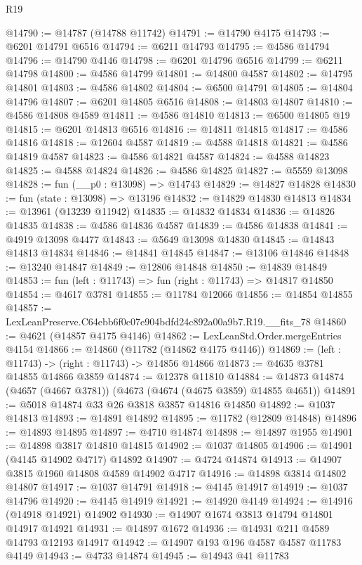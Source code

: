 \begin{lexlean}{R19}
\begin{coremodule}
@14790 := @14787 (@14788 @11742)
@14791 := @14790 @4175
@14793 := @6201 @14791 @6516
@14794 := @6211 @14793
@14795 := @4586 @14794
@14796 := @14790 @4146
@14798 := @6201 @14796 @6516
@14799 := @6211 @14798
@14800 := @4586 @14799
@14801 := @14800 @4587
@14802 := @14795 @14801
@14803 := @4586 @14802
@14804 := @6500 @14791
@14805 := @14804 @14796
@14807 := @6201 @14805 @6516
@14808 := @14803 @14807
@14810 := @4586 @14808 @4589
@14811 := @4586 @14810
@14813 := @6500 @14805 @19
@14815 := @6201 @14813 @6516
@14816 := @14811 @14815
@14817 := @4586 @14816
@14818 := @12604 @4587
@14819 := @4588 @14818
@14821 := @4586 @14819 @4587
@14823 := @4586 @14821 @4587
@14824 := @4588 @14823
@14825 := @4588 @14824
@14826 := @4586 @14825
@14827 := @5559 @13098
@14828 := fun (__p0 : @13098) => @14743
@14829 := @14827 @14828
@14830 := fun (state : @13098) => @13196
@14832 := @14829 @14830 @14813
@14834 := @13961 (@13239 @11942)
@14835 := @14832 @14834
@14836 := @14826 @14835
@14838 := @4586 @14836 @4587
@14839 := @4586 @14838
@14841 := @4919 @13098 @4477
@14843 := @5649 @13098 @14830
@14845 := @14843 @14813 @14834
@14846 := @14841 @14845
@14847 := @13106 @14846
@14848 := @13240 @14847
@14849 := @12806 @14848
@14850 := @14839 @14849
@14853 := fun (left : @11743) => fun (right : @11743) => @14817 @14850
@14854 := @4617 @3781
@14855 := @11784 @12066
@14856 := @14854 @14855
@14857 := LexLeanPreserve.C64ebb6f0c07e904bdfd24c892a00a9b7.R19.__fits_78
@14860 := @4621 (@14857 @4175 @4146)
@14862 := LexLeanStd.Order.mergeEntries @4154
@14866 := @14860 (@11782 (@14862 @4175 @4146))
@14869 := (left : @11743) -> (right : @11743) -> @14856 @14866
@14873 := @4635 @3781 @14855 @14866 @3859
@14874 := @12378 @11810
@14884 := @14873 @14874 (@4657 (@4667 @3781)) (@4673 (@4674 (@4675 @3859) @14855 @4651))
@14891 := @5018 @14874 @33 @26 @3818 @3857 @14816 @14850
@14892 := @1037 @14813
@14893 := @14891 @14892
@14895 := @11782 (@12809 @14848)
@14896 := @14893 @14895
@14897 := @4710 @14874
@14898 := @14897 @1955
@14901 := @14898 @3817 @14810 @14815
@14902 := @1037 @14805
@14906 := @14901 (@4145 @14902 @4717) @14892
@14907 := @4724 @14874
@14913 := @14907 @3815 @1960 @14808 @4589 @14902 @4717
@14916 := @14898 @3814 @14802 @14807
@14917 := @1037 @14791
@14918 := @4145 @14917
@14919 := @1037 @14796
@14920 := @4145 @14919
@14921 := @14920 @4149
@14924 := @14916 (@14918 @14921) @14902
@14930 := @14907 @1674 @3813 @14794 @14801 @14917 @14921
@14931 := @14897 @1672
@14936 := @14931 @211 @4589 @14793 @12193 @14917
@14942 := @14907 @193 @196 @4587 @4587 @11783 @4149
@14943 := @4733 @14874
@14945 := @14943 @41 @11783

\end{coremodule}
\end{lexlean}
